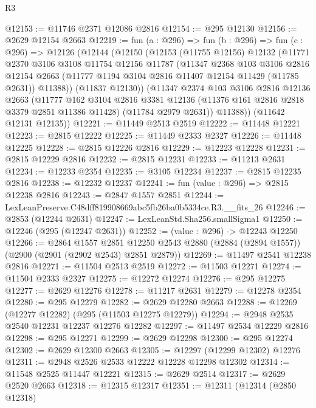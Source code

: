 \begin{lexlean}{R3}
\begin{coremodule}
@12153 := @11746 @2371 @12086 @2816
@12154 := @295 @12130
@12156 := @2629 @12154 @2663
@12219 := fun (a : @296) =>
  fun (b : @296) =>
  fun (c : @296) =>
  @12126
    (@12144
      (@12150
        (@12153
          (@11755 @12156)
          @12132
          (@11771
            @2370
            @3106
            @3108
            @11754
            @12156
            @11787
            (@11347
              @2368
              @103
              @3106
              @2816
              @12154
              @2663
              (@11777 @1194 @3104 @2816 @11407 @12154 @11429 (@11785 @2631))
              @11388))
          (@11837 @12130))
        (@11347
          @2374
          @103
          @3106
          @2816
          @12136
          @2663
          (@11777
            @162
            @3104
            @2816
            @3381
            @12136
            (@11376 @161 @2816 @2818 @3379 @2851 @11386 @11428)
            (@11784 @2979 @2631))
          @11388))
      (@11642 @12131 @12135))
@12221 := @11449 @2513 @2519
@12222 := @11448 @12221
@12223 := @2815 @12222
@12225 := @11449 @2333 @2327
@12226 := @11448 @12225
@12228 := @2815 @12226 @2816
@12229 := @12223 @12228
@12231 := @2815 @12229 @2816
@12232 := @2815 @12231
@12233 := @11213 @2631
@12234 := @12233 @2354
@12235 := @3105 @12234
@12237 := @2815 @12235 @2816
@12238 := @12232 @12237
@12241 := fun (value : @296) => @2815 @12238 @2816
@12243 := @2847 @1557 @2851
@12244 := LexLeanPreserve.C48dff819908669abc5fb26ba0b5334ce.R3.__fits_26
@12246 := @2853 (@12244 @2631)
@12247 := LexLeanStd.Sha256.smallSigma1
@12250 := @12246 (@295 (@12247 @2631))
@12252 := (value : @296) -> @12243 @12250
@12266 := @2864
    @1557
    @2851
    @12250
    @2543
    @2880
    (@2884 (@2894 @1557))
    (@2900 (@2901 (@2902 @2543) @2851 @2879))
@12269 := @11497 @2541 @12238 @2816
@12271 := @11504 @2513 @2519
@12272 := @11503 @12271
@12274 := @11504 @2333 @2327
@12275 := @12272 @12274
@12276 := @295 @12275
@12277 := @2629 @12276
@12278 := @11217 @2631
@12279 := @12278 @2354
@12280 := @295 @12279
@12282 := @2629 @12280 @2663
@12288 := @12269 (@12277 @12282) (@295 (@11503 @12275 @12279))
@12294 := @2948 @2535 @2540 @12231 @12237 @12276 @12282
@12297 := @11497 @2534 @12229 @2816
@12298 := @295 @12271
@12299 := @2629 @12298
@12300 := @295 @12274
@12302 := @2629 @12300 @2663
@12305 := @12297 (@12299 @12302) @12276
@12311 := @2948 @2526 @2533 @12222 @12228 @12298 @12302
@12314 := @11548 @2525 @11447 @12221
@12315 := @2629 @2514
@12317 := @2629 @2520 @2663
@12318 := @12315 @12317
@12351 := @12311
    (@12314
      (@2850 @12318)

\end{coremodule}
\end{lexlean}
